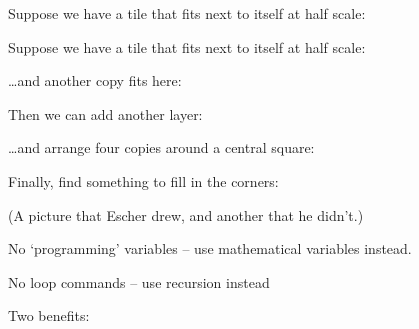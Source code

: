 




Suppose we have a tile that fits next to itself at half scale:




Suppose we have a tile that fits next to itself at half scale:




\dots and another copy fits here:




Then we can add another layer:




\dots and arrange four copies around a central square:

\rmargin=0pt



Finally, find something to fill in the corners:



(A picture that Escher drew, and another that he didn't.)


\item No `programming' variables -- use mathematical variables instead.
\item No loop commands -- use recursion instead

Two benefits:

